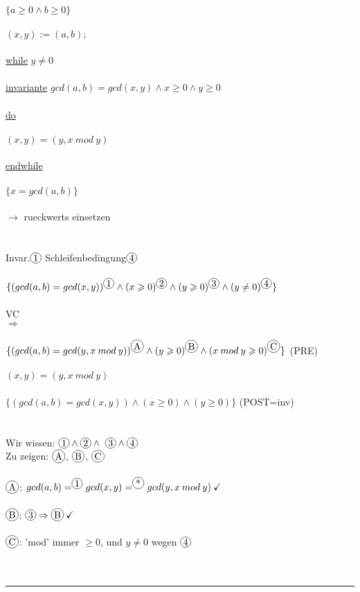 \documentclass[18pt,a4paper]{article}
\newcommand*\circled[1]{\tikz[baseline=(char.base)]{
            \node[shape=circle,draw,inner sep=1pt] (char) {#1};}}
\newcommand{\tab}{\hspace*{2em}}
\begin{document}
$\{a\geqslant 0 \wedge b\geqslant 0\}$\\
\\
$(x,y) := (a,b);$\\
\\
\uline{while} $y \neq 0$ \\
\\
\tab \uline{invariante} $gcd(a,b) = gcd(x,y) \wedge x\geqslant 0 \wedge y\geqslant 0$\\
\\
\tab \uline{do}\\
\\
\tab \tab$(x,y) = (y, x\: mod\: y)$\\
\\
\uline{endwhile}\\
\\
$\{x = gcd(a,b)\}$\\
\\
$\rightarrow$ rueckwerts einsetzen\\
\\
\\
Invar.$\circled{1}$ \tab\tab\tab\tab\tab\tab\tab Schleifenbedingung$\circled{4}$\\
\\
$\{ (gcd(a,b) = gcd(x,y))^{\circled{1}} \wedge (x\geqslant 0)^{\circled{2}} \wedge (y\geqslant 0)^{\circled{3}} \wedge (y\neq 0)^{\circled{4}}\}$\\
\\
VC\\
$\Rightarrow$\\
\\
$\{ (gcd(a,b) = gcd(y,x\: mod\: y))^{\circled{A}} \wedge (y\geqslant 0)^{\circled{B}} \wedge (x\: mod\: y \geqslant 0)^{\circled{C}} \}$ (PRE)\\
\\
\tab$(x,y) = (y, x\: mod\: y)$\\
\\
$\{ (gcd(a,b) = gcd(x,y)) \wedge (x\geqslant 0) \wedge (y\geqslant 0) \}$ (POST=inv)\\
\\
\\
Wir wissen: $\circled{1} \wedge \circled{2} \wedge\ \circled{3} \wedge \circled{4}$\\
Zu zeigen: $\circled{A}$, $\circled{B}$, $\circled{C}$\\
\\
$\circled{A}$: $gcd(a,b) =^{\circled{1}} gcd(x,y) =^{\circled{*}} gcd(y, x\: mod\: y)\: \checkmark$\\
\\
$\circled{B}$: $\circled{3} \Rightarrow \circled{B}\: \checkmark$\\
\\
$\circled{C}$: 'mod' immer $\geqslant 0$, und $y \neq 0$ wegen $\circled{4}$\\
\\
\\
\rule{\textwidth}{0.4mm}\\
\\
\end{document}
